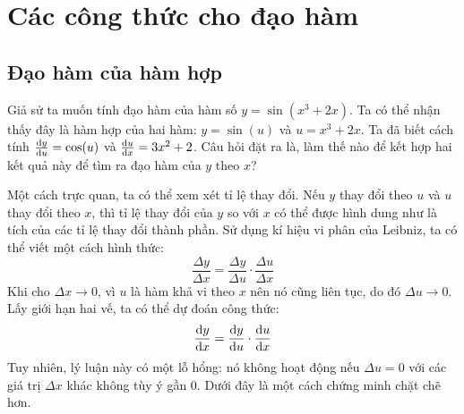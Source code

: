 \section{Các công thức cho đạo hàm}
\subsection{Đạo hàm của hàm hợp}

Giả sử ta muốn tính đạo hàm của hàm số $y = \sin(x^3 + 2x)$. Ta có thể nhận thấy đây là hàm hợp của hai hàm: $y = \sin(u)$ và $u = x^3 + 2x$. Ta đã biết cách tính $\frac{\mathrm{d}y}{\mathrm{d}u} = \cos(u)$ và $\frac{\mathrm{d}u}{\mathrm{d}x} = 3x^2 + 2$. Câu hỏi đặt ra là, làm thế nào để kết hợp hai kết quả này để tìm ra đạo hàm của $y$ theo $x$?

Một cách trực quan, ta có thể xem xét tỉ lệ thay đổi. Nếu $y$ thay đổi theo $u$ và $u$ thay đổi theo $x$, thì tỉ lệ thay đổi của $y$ so với $x$ có thể được hình dung như là tích của các tỉ lệ thay đổi thành phần. Sử dụng kí hiệu vi phân của Leibniz, ta có thể viết một cách hình thức:
$$
\dfrac{\Delta y}{\Delta x} = \dfrac{\Delta y}{\Delta u} \cdot \dfrac{\Delta u}{\Delta x}
$$
Khi cho $\Delta x \to 0$, vì $u$ là hàm khả vi theo $x$ nên nó cũng liên tục, do đó $\Delta u \to 0$. Lấy giới hạn hai vế, ta có thể dự đoán công thức:
$$
\frac{\mathrm{d}y}{\mathrm{d}x} = \frac{\mathrm{d}y}{\mathrm{d}u} \cdot \frac{\mathrm{d}u}{\mathrm{d}x}
$$
Tuy nhiên, lý luận này có một lỗ hổng: nó không hoạt động nếu $\Delta u = 0$ với các giá trị $\Delta x$ khác không tùy ý gần 0. Dưới đây là một cách chứng minh chặt chẽ hơn.

